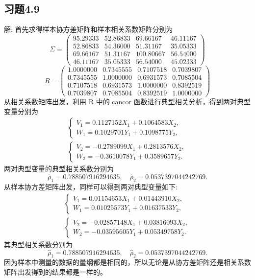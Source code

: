 \documentclass{ctexrep}
\begin{document}
\subsection*{习题4.9}
解: 首先求得样本协方差矩阵和样本相关系数矩阵分别为
\begin{equation*}
\Sigma=\begin{pmatrix}
95.29333 & 52.86833 & 69.66167 & 46.11167 \\
52.86833 & 54.36000 & 51.31167 & 35.05333 \\
69.66167 & 51.31167 & 100.80667 & 56.54000 \\
46.11167 & 35.05333 & 56.54000 & 45.02333
\end{pmatrix}
\end{equation*}
\begin{equation*}
R=\begin{pmatrix}
1.0000000 & 0.7345555 & 0.7107518 & 0.7039807 \\
0.7345555 & 1.0000000 & 0.6931573 & 0.7085504 \\
0.7107518 & 0.6931573 & 1.0000000 & 0.8392519 \\
0.7039807 & 0.7085504 & 0.8392519 & 1.0000000
\end{pmatrix}
\end{equation*}
从相关系数矩阵出发，利用 R 中的 cancor 函数进行典型相关分析，得到两对典型变量分别为
\begin{equation*}
\begin{aligned}
\begin{cases}
V_1=0.1127152X_1+0.1064583X_2, \\
W_1=0.1029701Y_1+0.1098775Y_2,
\end{cases} \\
\begin{cases}
V_2=-0.2789099X_1+0.2813576X_2, \\
W_2=-0.3610078Y_1+0.3589657Y_2.
\end{cases}
\end{aligned}
\end{equation*}
两对典型变量的典型相关系数分别为
\begin{equation*}
\hat\rho_1=0.788507916294635,\quad\hat\rho_2=0.0537397044242769.
\end{equation*}
从样本协方差矩阵出发，同样可以得到两对典型变量如下:
\begin{equation*}
\begin{aligned}
\begin{cases}
V_1=0.01154653X_1+0.01443910X_2, \\
W_1=0.01025573Y_1+0.01637533Y_2,
\end{cases} \\
\begin{cases}
V_2=-0.02857148X_1+0.03816093X_2, \\
W_2=-0.03595605Y_1+0.05349758Y_2.
\end{cases}
\end{aligned}
\end{equation*}
其典型相关系数分别为
\begin{equation*}
\hat\rho_1=0.788507916294635,\quad\hat\rho_2=0.0537397044242769.
\end{equation*}
因为样本中测量的数据的量纲都是相同的，所以无论是从协方差矩阵还是相关系数矩阵出发得到的结果都是一样的。
\end{document}
